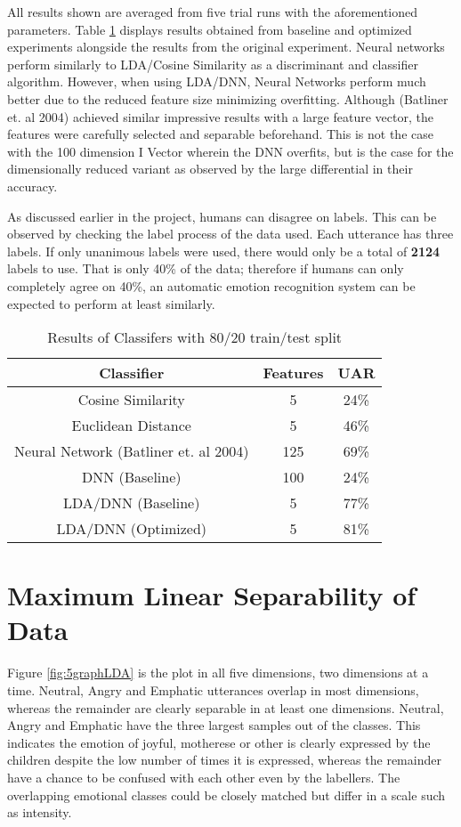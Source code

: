 	All results shown are averaged from five trial runs with the aforementioned parameters. Table \ref{overviewResults} displays results obtained from baseline and optimized experiments alongside the results from the original experiment. Neural networks perform similarly to LDA/Cosine Similarity as a discriminant and classifier algorithm. However, when using LDA/DNN, Neural Networks perform much better due to the reduced feature size minimizing overfitting. Although (Batliner et. al 2004) achieved similar impressive results with a large feature vector, the features were carefully selected and separable beforehand. This is not the case with the 100 dimension I Vector wherein the DNN overfits, but is the case for the dimensionally reduced variant as observed by the large differential in their accuracy.
	
	As discussed earlier in the project, humans can disagree on labels. This can be observed by checking the label process of the data used. Each utterance has three labels. If only unanimous labels were used, there would only be a total of \textbf{2124} labels to use. That is only 40\% of the data; therefore if humans can only completely agree on 40\%, an automatic emotion recognition system can be expected to perform at least similarly.
	\begin{table}[ht]
		\caption{Results of Classifers with 80/20 train/test split}
			\centering
		\begin{tabular}{|c|c|c|}
			\hline
			Classifier                            & Features & UAR  \\ \hline
			Cosine Similarity                     & 5        & 24\% \\ \hline
			Euclidean Distance                     & 5        & 46\% \\ \hline
			Neural Network (Batliner et. al 2004) & 125      & 69\% \\ \hline
			DNN (Baseline)                        & 100      & 24\% \\ \hline
			LDA/DNN (Baseline)                        & 5        & 77\% \\ \hline
			LDA/DNN (Optimized)                       & 5        & 81\% \\ \hline
		\end{tabular}
	\label{overviewResults}
	\end{table}
	\section{Maximum Linear Separability of Data}
	Figure \ref{fig:5graphLDA} is the plot in all five dimensions, two dimensions at a time. Neutral, Angry and Emphatic utterances overlap in most dimensions, whereas the remainder are clearly separable in at least one dimensions. Neutral, Angry and Emphatic have the three largest samples out of the classes. This indicates the emotion of joyful, motherese or other is clearly expressed by the children despite the low number of times it is expressed, whereas the remainder have a chance to be confused with each other even by the labellers. The overlapping emotional classes could be closely matched but differ in a scale such as intensity.
	
